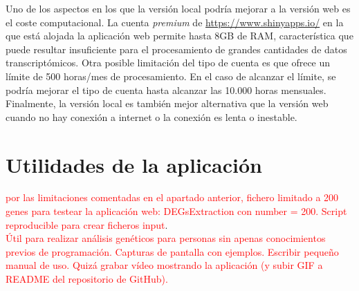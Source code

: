 Uno de los aspectos en los que la versión local podría mejorar a la versión web es el coste computacional. La cuenta \textit{premium} de \url{https://www.shinyapps.io/} en la que está alojada la aplicación web permite hasta 8GB de RAM, característica que puede resultar insuficiente para el procesamiento de grandes cantidades de datos transcriptómicos. Otra posible limitación del tipo de cuenta es que ofrece un límite de 500 horas/mes de procesamiento. En el caso de alcanzar el límite, se podría mejorar el tipo de cuenta hasta alcanzar las 10.000 horas mensuales. Finalmente, la versión local es también mejor alternativa que la versión web cuando no hay conexión a internet o la conexión es lenta o inestable.

\section{Utilidades de la aplicación}


\textcolor{red}{por las limitaciones comentadas en el apartado anterior, fichero limitado a 200 genes para testear la aplicación web: DEGsExtraction con number = 200. Script reproducible para crear ficheros input}.\\

\textcolor{red}{Útil para realizar análisis genéticos para personas sin apenas conocimientos previos de programación. Capturas de pantalla con ejemplos. Escribir pequeño manual de uso. Quizá grabar vídeo mostrando la aplicación (y subir GIF a README del repositorio de GitHub).}
